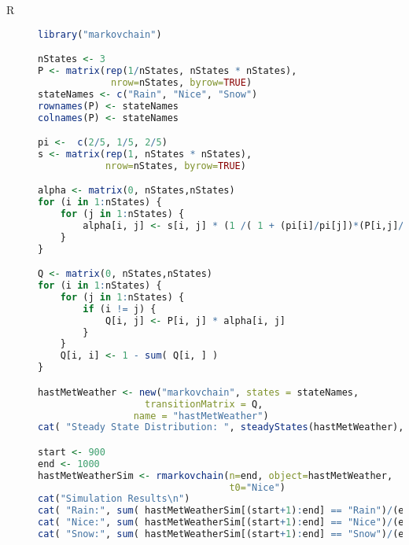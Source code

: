 
\begin{description}


\item[R] 


\begin{lstlisting}[language=R]
library("markovchain")

nStates <- 3
P <- matrix(rep(1/nStates, nStates * nStates),
             nrow=nStates, byrow=TRUE)
stateNames <- c("Rain", "Nice", "Snow")
rownames(P) <- stateNames
colnames(P) <- stateNames

pi <-  c(2/5, 1/5, 2/5)
s <- matrix(rep(1, nStates * nStates),
            nrow=nStates, byrow=TRUE)

alpha <- matrix(0, nStates,nStates)
for (i in 1:nStates) {
    for (j in 1:nStates) {
        alpha[i, j] <- s[i, j] * (1 /( 1 + (pi[i]/pi[j])*(P[i,j]/P[j,i])))
    }
}

Q <- matrix(0, nStates,nStates)
for (i in 1:nStates) {
    for (j in 1:nStates) {
        if (i != j) {
            Q[i, j] <- P[i, j] * alpha[i, j]
        }
    }
    Q[i, i] <- 1 - sum( Q[i, ] ) 
}

hastMetWeather <- new("markovchain", states = stateNames,
                   transitionMatrix = Q,
                 name = "hastMetWeather")
cat( "Steady State Distribution: ", steadyStates(hastMetWeather), "\n" )

start <- 900
end <- 1000
hastMetWeatherSim <- rmarkovchain(n=end, object=hastMetWeather,
                                  t0="Nice")
cat("Simulation Results\n")
cat( "Rain:", sum( hastMetWeatherSim[(start+1):end] == "Rain")/(end-start), "\n")
cat( "Nice:", sum( hastMetWeatherSim[(start+1):end] == "Nice")/(end-start), "\n")
cat( "Snow:", sum( hastMetWeatherSim[(start+1):end] == "Snow")/(end-start), "\n")
\end{lstlisting}  

\end{description}



